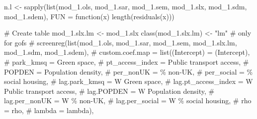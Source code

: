 \documentclass[
  letterpaper,
]{scrbook}
\newenvironment{Shaded}{\begin{snugshade}}{\end{snugshade}}
\newcommand{\AttributeTok}[1]{\textcolor[rgb]{0.40,0.45,0.13}{#1}}
\newcommand{\CommentTok}[1]{\textcolor[rgb]{0.37,0.37,0.37}{#1}}
\newcommand{\ControlFlowTok}[1]{\textcolor[rgb]{0.00,0.23,0.31}{#1}}
\newcommand{\FunctionTok}[1]{\textcolor[rgb]{0.28,0.35,0.67}{#1}}
\newcommand{\NormalTok}[1]{\textcolor[rgb]{0.00,0.23,0.31}{#1}}
\newcommand{\OtherTok}[1]{\textcolor[rgb]{0.00,0.23,0.31}{#1}}
\newcommand{\StringTok}[1]{\textcolor[rgb]{0.13,0.47,0.30}{#1}}
\begin{document}
\begin{Shaded}
\begin{Highlighting}[]
\NormalTok{n.l }\OtherTok{\textless{}{-}} \FunctionTok{sapply}\NormalTok{(}\FunctionTok{list}\NormalTok{(mod\_1.ols, mod\_1.sar, mod\_1.sem, mod\_1.slx, mod\_1.sdm, mod\_1.sdem),}
       \AttributeTok{FUN =} \ControlFlowTok{function}\NormalTok{(x) }\FunctionTok{length}\NormalTok{(}\FunctionTok{residuals}\NormalTok{(x)))}

\CommentTok{\# Create table}
\NormalTok{mod\_1.slx.lm }\OtherTok{\textless{}{-}}\NormalTok{ mod\_1.slx}
\FunctionTok{class}\NormalTok{(mod\_1.slx.lm) }\OtherTok{\textless{}{-}} \StringTok{"lm"} \CommentTok{\# only for gofs}
\CommentTok{\# screenreg(list(mod\_1.ols, mod\_1.sar, mod\_1.sem, mod\_1.slx.lm, mod\_1.sdm, mod\_1.sdem),}
\CommentTok{\#           custom.coef.map = list(\textquotesingle{}(Intercept)\textquotesingle{} =  \textquotesingle{}(Intercept)\textquotesingle{},}
\CommentTok{\#                                  \textquotesingle{}park\_kmsq\textquotesingle{} =  \textquotesingle{}Green space\textquotesingle{},}
\CommentTok{\#                                  \textquotesingle{}pt\_access\_index\textquotesingle{} =  \textquotesingle{}Public transport access\textquotesingle{},}
\CommentTok{\#                                  \textquotesingle{}POPDEN\textquotesingle{} =  \textquotesingle{}Population density\textquotesingle{},}
\CommentTok{\#                                  \textquotesingle{}per\_nonUK\textquotesingle{} =  \textquotesingle{}\% non{-}UK\textquotesingle{},}
\CommentTok{\#                                  \textquotesingle{}per\_social\textquotesingle{} = \textquotesingle{}\% social housing\textquotesingle{},}
\CommentTok{\#                                  \textquotesingle{}lag.park\_kmsq\textquotesingle{} =  \textquotesingle{}W Green space\textquotesingle{},}
\CommentTok{\#                                  \textquotesingle{}lag.pt\_access\_index\textquotesingle{} =  \textquotesingle{}W Public transport access\textquotesingle{},}
\CommentTok{\#                                  \textquotesingle{}lag.POPDEN\textquotesingle{} =  \textquotesingle{}W Population density\textquotesingle{},}
\CommentTok{\#                                  \textquotesingle{}lag.per\_nonUK\textquotesingle{} =  \textquotesingle{}W \% non{-}UK\textquotesingle{},}
\CommentTok{\#                                  \textquotesingle{}lag.per\_social\textquotesingle{} = \textquotesingle{}W \% social housing\textquotesingle{},}
\CommentTok{\#                                  \textquotesingle{}rho\textquotesingle{} = \textquotesingle{}rho\textquotesingle{},}
\CommentTok{\#                                  \textquotesingle{}lambda\textquotesingle{} = \textquotesingle{}lambda\textquotesingle{}),}

\end{Highlighting}
\end{Shaded}
\end{document}
